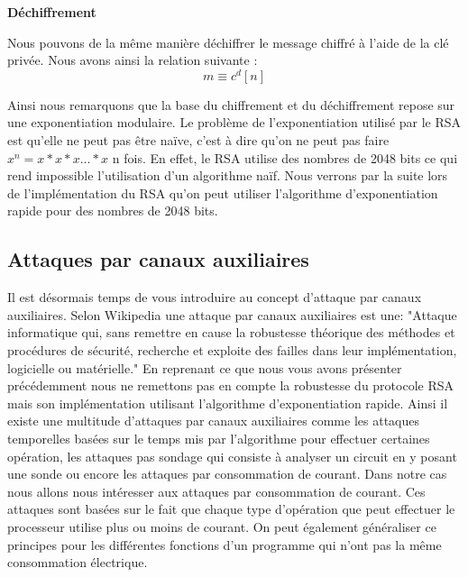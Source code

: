 \textbf{Déchiffrement}


Nous pouvons de la même manière déchiffrer le message chiffré à l'aide de la clé privée. 
Nous avons ainsi la relation suivante :
\begin{equation}
\label{eq:dechiffrement}
m \equiv c^d [n]
\end{equation}


Ainsi nous remarquons que la base du chiffrement et du déchiffrement repose sur une exponentiation modulaire. Le problème de l'exponentiation utilisé par le RSA est qu'elle ne peut pas être naïve, c'est à dire qu'on ne peut pas faire $ x^n = x*x*x...*x$ n fois. En effet, le RSA utilise des nombres de 2048 bits ce qui rend impossible l'utilisation d'un algorithme naïf.
Nous verrons par la suite lors de l'implémentation du RSA qu'on peut utiliser l'algorithme d'exponentiation rapide pour des nombres de 2048 bits.
\subsection{Attaques par canaux auxiliaires}
Il est désormais temps de vous introduire au concept d'attaque par canaux auxiliaires.
Selon Wikipedia \cite{wki:sca} une attaque par canaux auxiliaires est une:
"Attaque informatique qui, sans remettre en cause la robustesse théorique des méthodes et procédures de sécurité, recherche et exploite des failles dans leur implémentation, logicielle ou matérielle."
En reprenant ce que nous vous avons présenter précédemment nous ne remettons pas en compte la robustesse du protocole RSA mais son implémentation utilisant l'algorithme d’exponentiation rapide.
Ainsi il existe une multitude d'attaques par canaux auxiliaires comme les attaques temporelles basées sur le temps mis par l'algorithme pour effectuer certaines opération, les attaques pas sondage qui consiste à analyser un circuit en y posant une sonde ou encore les attaques par consommation de courant.
Dans notre cas nous allons nous intéresser aux attaques par consommation de courant. Ces attaques sont basées sur le fait que chaque type d'opération que peut effectuer le processeur utilise plus ou moins de courant. On peut également généraliser ce principes pour les différentes fonctions d'un programme qui n'ont pas la même consommation électrique.
